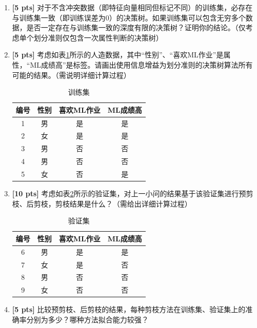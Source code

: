 \documentclass[a4paper,UTF8]{article}
\theoremstyle{definition}
\begin{document}
\begin{enumerate}[(1)]
	\item \textbf{[5 pts]} 对于不含冲突数据（即特征向量相同但标记不同）的训练集，必存在与训练集一致（即训练误差为$0$）的决策树。如果训练集可以包含无穷多个数据，是否一定存在与训练集一致的深度有限的决策树？证明你的结论。（仅考虑单个划分准则仅包含一次属性判断的决策树）
	\item \textbf{[5 pts]} 考虑如表\ref{train data for tree}所示的人造数据，其中“性别”、“喜欢ML作业”是属性，“ML成绩高”是标签。请画出使用信息增益为划分准则的决策树算法所有可能的结果。（需说明详细计算过程）
	\begin{table}[h]
		\caption{训练集}
		\label{train data for tree}
		\centering
		\begin{tabular}{cccc}
			\hline 
			编号 & 性别 & 喜欢ML作业 & ML成绩高 \\ 
			\hline 
			1 & 男 & 是 & 是 \\ 
			2 & 女 & 是 & 是 \\ 
			3 & 男 & 否 & 否 \\ 
			4 & 男 & 否 & 否 \\ 
			5 & 女 & 否 & 是 \\ 
			\hline 
		\end{tabular}
	\end{table}
	\item \textbf{[10 pts]} 考虑如表\ref{validation data for tree}所示的验证集，对上一小问的结果基于该验证集进行预剪枝、后剪枝，剪枝结果是什么？（需给出详细计算过程）
	\begin{table}[h]
		\caption{验证集}
		\label{validation data for tree}
		\centering
		\begin{tabular}{cccc}
			\hline 
			编号 & 性别 & 喜欢ML作业 & ML成绩高 \\ 
			\hline 
			6 & 男 & 是 & 是 \\ 
			7 & 女 & 是 & 否 \\ 
			8 & 男 & 否 & 否 \\ 
			9 & 女 & 否 & 否 \\ 
			\hline 
		\end{tabular}
	\end{table}
	\item \textbf{[5 pts]} 比较预剪枝、后剪枝的结果，每种剪枝方法在训练集、验证集上的准确率分别为多少？哪种方法拟合能力较强？
\end{enumerate}
\end{document}
